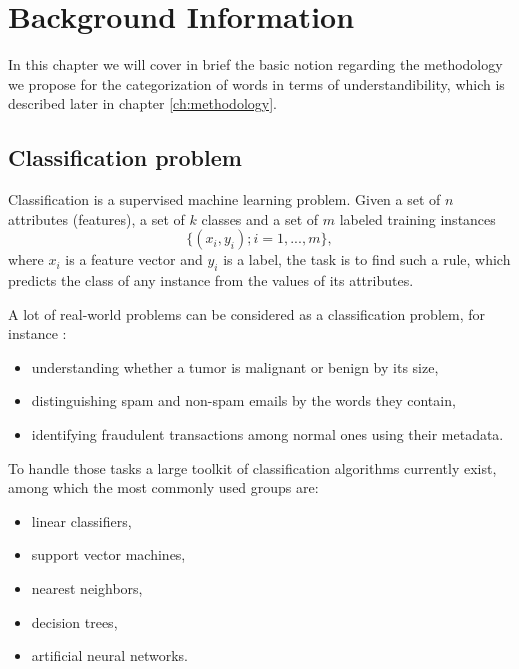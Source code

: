 \chapter{Background Information}
\label{ch:background-information}


In this chapter we will cover in brief the basic notion regarding the methodology we propose for the categorization of words in terms of understandibility, which is described later in chapter \ref{ch:methodology}.

\section{Classification problem}
Classification is a supervised machine learning problem. Given a set
of $n$ attributes (features), a set of $k$ classes and  a set of $m$
labeled training instances $$\{(x_i,y_i); i=1,...,m\},$$ where $x_i$
is a feature vector and $y_i$  is a label, the task is to find such a
rule, which predicts the class of any instance from the values of its attributes.

A lot of real-world problems can be considered as a classification problem, for instance \citep{Ng-2012cs229}:
\begin{itemize}
    \item understanding whether a tumor is malignant or benign by its size,
    \item distinguishing spam and non-spam emails by the words they contain,
    \item identifying fraudulent transactions among normal ones using their metadata.
\end{itemize}
To handle those tasks a large toolkit  of classification algorithms currently exist, among which the most commonly used groups are: 
\begin{itemize}
 \item linear classifiers,
 \item support vector machines,
 \item nearest neighbors,
 \item decision trees,
 \item artificial neural networks.
\end{itemize} 

